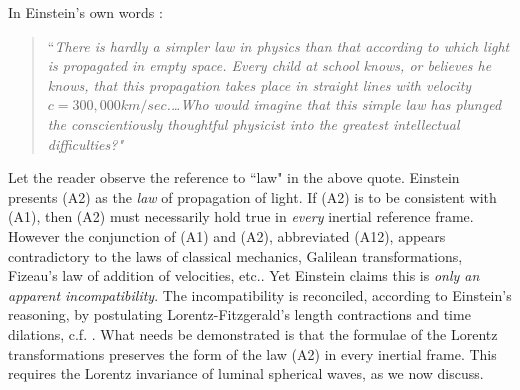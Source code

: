 \documentclass[12pt]{amsart}
\theoremstyle{definition}
\theoremstyle{remark}
\begin{document}
In Einstein's own words \cite[Ch.7, 11]{einstein2019relativity}:

\begin{quote} 
``\emph{There is hardly a simpler law in physics than that according to which light is propagated in empty space. Every child at school knows, or believes he knows, that this propagation takes place in straight lines with velocity $c=300, 000 km/sec$.\ldots Who would imagine that this simple law has plunged the conscientiously thoughtful physicist into the greatest intellectual difficulties?"} 
\end{quote}

Let the reader observe the reference to ``law" in the above quote. Einstein presents (A2) as the \emph{law} of propagation of light. If (A2) is to be consistent with (A1), then (A2) must necessarily hold true in \emph{every} inertial reference frame. However the conjunction of (A1) and (A2), abbreviated (A12), appears contradictory to the laws of classical mechanics, Galilean transformations, Fizeau's law of addition of velocities, etc.. Yet Einstein claims this is \emph{only an apparent incompatibility}. The incompatibility is reconciled, according to Einstein's reasoning, by postulating Lorentz-Fitzgerald's length contractions and time dilations, c.f. \cite[Ch.XIV]{michelson}. What needs be demonstrated is that the formulae of the Lorentz transformations preserves the form of the law (A2) in every inertial frame. This requires the Lorentz invariance of luminal spherical waves, as we now discuss.






\end{document}
